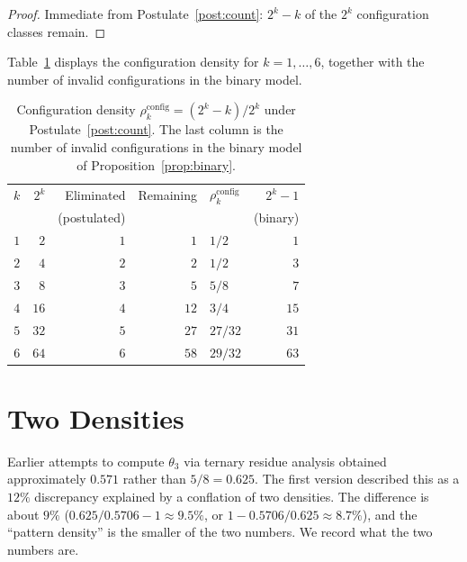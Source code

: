 \documentclass[12pt]{amsart}
\theoremstyle{plain}
\theoremstyle{definition}
\theoremstyle{remark}
\newcommand{\rhoc}{\rho^{\mathrm{config}}}
\begin{document}
\begin{proof}
Immediate from Postulate~\ref{post:count}: $2^k - k$ of the $2^k$ configuration
classes remain.
\end{proof}

Table~\ref{tab:density} displays the configuration density for $k = 1, \ldots, 6$,
together with the number of invalid configurations in the binary model.

\begin{table}[h]
\centering
\caption{Configuration density $\rhoc_k = (2^k - k)/2^k$ under
  Postulate~\ref{post:count}. The last column is the number of invalid
  configurations in the binary model of Proposition~\ref{prop:binary}.}
\label{tab:density}
\begin{tabular}{rrrrlr}
\toprule
$k$ & $2^k$ & Eliminated & Remaining & $\rhoc_k$ & $2^k - 1$ \\
    &       & (postulated) &         &           & (binary) \\
\midrule
$1$ & $2$  & $1$ & $1$  & $1/2$   & $1$ \\
$2$ & $4$  & $2$ & $2$  & $1/2$   & $3$ \\
$3$ & $8$  & $3$ & $5$  & $5/8$   & $7$ \\
$4$ & $16$ & $4$ & $12$ & $3/4$   & $15$ \\
$5$ & $32$ & $5$ & $27$ & $27/32$ & $31$ \\
$6$ & $64$ & $6$ & $58$ & $29/32$ & $63$ \\
\bottomrule
\end{tabular}
\end{table}

\section{Two Densities}
\label{sec:densities}

Earlier attempts to compute $\theta_3$ via ternary residue analysis obtained
approximately $0.571$ rather than $5/8 = 0.625$. The first version described
this as a $12\%$ discrepancy explained by a conflation of two densities. The
difference is about $9\%$ ($0.625/0.5706 - 1 \approx 9.5\%$, or
$1 - 0.5706/0.625 \approx 8.7\%$), and the ``pattern density'' is the smaller of
the two numbers. We record what the two numbers are.
\end{document}
